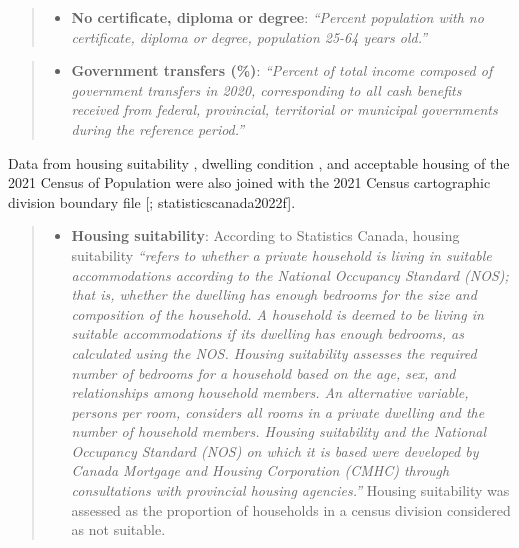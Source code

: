 \documentclass[preprint, 3p,
authoryear]{elsarticle} %
\providecommand{\tightlist}{%
  \setlength{\itemsep}{0pt}\setlength{\parskip}{0pt}}
\begin{document}
\begin{quote}
\begin{itemize}
\tightlist
\item
  \textbf{No certificate, diploma or degree}: \emph{``Percent population
  with no certificate, diploma or degree, population 25-64 years old.''}
\end{itemize}
\end{quote}

\begin{quote}
\begin{itemize}
\tightlist
\item
  \textbf{Government transfers (\%)}: \emph{``Percent of total income
  composed of government transfers in 2020, corresponding to all cash
  benefits received from federal, provincial, territorial or municipal
  governments during the reference period.''}
\end{itemize}
\end{quote}

Data from housing suitability \citep{statisticscanada2022c}, dwelling
condition \citep{statisticscanada2022d}, and acceptable housing
\citep{statisticscanada2022e} of the 2021 Census of Population
\citep{statisticscanada2021a} were also joined with the 2021 Census
cartographic division boundary file {[}\citet{statisticscanada2022};
statisticscanada2022f{]}.

\begin{quote}
\begin{itemize}
\tightlist
\item
  \textbf{Housing suitability}: According to Statistics Canada, housing
  suitability \emph{``refers to whether a private household is living in
  suitable accommodations according to the National Occupancy Standard
  (NOS); that is, whether the dwelling has enough bedrooms for the size
  and composition of the household. A household is deemed to be living
  in suitable accommodations if its dwelling has enough bedrooms, as
  calculated using the NOS. Housing suitability assesses the required
  number of bedrooms for a household based on the age, sex, and
  relationships among household members. An alternative variable,
  persons per room, considers all rooms in a private dwelling and the
  number of household members. Housing suitability and the National
  Occupancy Standard (NOS) on which it is based were developed by Canada
  Mortgage and Housing Corporation (CMHC) through consultations with
  provincial housing agencies.''} Housing suitability was assessed as
  the proportion of households in a census division considered as not
  suitable.
\end{itemize}
\end{quote}
\end{document}
